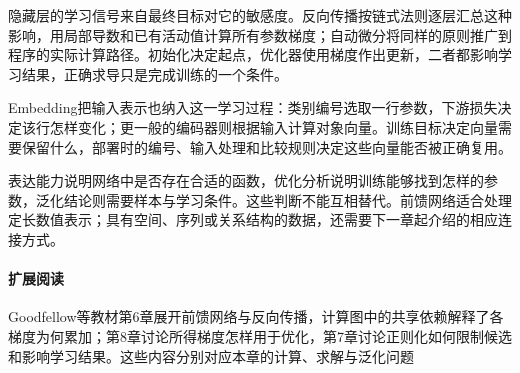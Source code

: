 隐藏层的学习信号来自最终目标对它的敏感度。反向传播按链式法则逐层汇总这种影响，用局部导数和已有活动值计算所有参数梯度；自动微分将同样的原则推广到程序的实际计算路径。初始化决定起点，优化器使用梯度作出更新，二者都影响学习结果，正确求导只是完成训练的一个条件。

Embedding把输入表示也纳入这一学习过程：类别编号选取一行参数，下游损失决定该行怎样变化；更一般的编码器则根据输入计算对象向量。训练目标决定向量需要保留什么，部署时的编号、输入处理和比较规则决定这些向量能否被正确复用。

表达能力说明网络中是否存在合适的函数，优化分析说明训练能够找到怎样的参数，泛化结论则需要样本与学习条件。这些判断不能互相替代。前馈网络适合处理定长数值表示；具有空间、序列或关系结构的数据，还需要下一章起介绍的相应连接方式。

\paragraph{扩展阅读}
Goodfellow等教材第6章展开前馈网络与反向传播，计算图中的共享依赖解释了各梯度为何累加；第8章讨论所得梯度怎样用于优化，第7章讨论正则化如何限制候选和影响学习结果。这些内容分别对应本章的计算、求解与泛化问题
